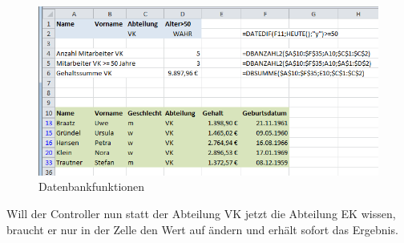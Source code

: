 	\begin{figure}[H]
		\centering
			\includegraphics[scale=0.7]{images/datenbankfunktion}
		\caption{Datenbankfunktionen}
		\label{fig:datenbankfunktionen}
	\end{figure}

Will der Controller nun statt der Abteilung VK jetzt die Abteilung EK wissen, braucht er nur in der Zelle  den Wert  auf  ändern und erhält sofort das Ergebnis.
